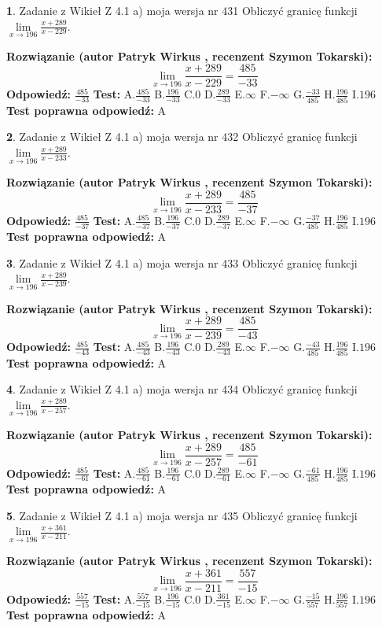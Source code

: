 \documentclass[12pt, a4paper]{article}
\theoremstyle{definition} %
\newtheorem{zad}{}
\newcommand{\zadStart}[1]{\begin{zad}#1\newline}
\newcommand{\zadStop}{\end{zad}}
\newcommand{\rozwStart}[2]{\noindent \textbf{Rozwiązanie (autor #1 , recenzent #2): }\newline}
\newcommand{\rozwStop}{\newline}
\newcommand{\odpStart}{\noindent \textbf{Odpowiedź:}\newline}
\newcommand{\odpStop}{\newline}
\newcommand{\testStart}{\noindent \textbf{Test:}\newline}
\newcommand{\testStop}{\newline}
\newcommand{\kluczStart}{\noindent \textbf{Test poprawna odpowiedź:}\newline}
\newcommand{\kluczStop}{\newline}
\begin{document}
\zadStart{Zadanie z Wikieł Z 4.1 a) moja wersja nr 431}
Obliczyć granicę funkcji $\lim\limits_{x\to196}\frac{x+289}{x-229}$.
\zadStop
\rozwStart{Patryk Wirkus}{Szymon Tokarski}
$$\lim\limits_{x\to196}\frac{x+289}{x-229} = \frac{485}{-33}$$
\rozwStop
\odpStart
$\frac{485}{-33}$
\odpStop
\testStart
A.$\frac{485}{-33}$
B.$\frac{196}{-33}$
C.$0$
D.$\frac{289}{-33}$
E.$\infty$
F.$-\infty$
G.$\frac{-33}{485}$
H.$\frac{196}{485}$
I.$196$
\testStop
\kluczStart
A
\kluczStop



\zadStart{Zadanie z Wikieł Z 4.1 a) moja wersja nr 432}
Obliczyć granicę funkcji $\lim\limits_{x\to196}\frac{x+289}{x-233}$.
\zadStop
\rozwStart{Patryk Wirkus}{Szymon Tokarski}
$$\lim\limits_{x\to196}\frac{x+289}{x-233} = \frac{485}{-37}$$
\rozwStop
\odpStart
$\frac{485}{-37}$
\odpStop
\testStart
A.$\frac{485}{-37}$
B.$\frac{196}{-37}$
C.$0$
D.$\frac{289}{-37}$
E.$\infty$
F.$-\infty$
G.$\frac{-37}{485}$
H.$\frac{196}{485}$
I.$196$
\testStop
\kluczStart
A
\kluczStop



\zadStart{Zadanie z Wikieł Z 4.1 a) moja wersja nr 433}
Obliczyć granicę funkcji $\lim\limits_{x\to196}\frac{x+289}{x-239}$.
\zadStop
\rozwStart{Patryk Wirkus}{Szymon Tokarski}
$$\lim\limits_{x\to196}\frac{x+289}{x-239} = \frac{485}{-43}$$
\rozwStop
\odpStart
$\frac{485}{-43}$
\odpStop
\testStart
A.$\frac{485}{-43}$
B.$\frac{196}{-43}$
C.$0$
D.$\frac{289}{-43}$
E.$\infty$
F.$-\infty$
G.$\frac{-43}{485}$
H.$\frac{196}{485}$
I.$196$
\testStop
\kluczStart
A
\kluczStop



\zadStart{Zadanie z Wikieł Z 4.1 a) moja wersja nr 434}
Obliczyć granicę funkcji $\lim\limits_{x\to196}\frac{x+289}{x-257}$.
\zadStop
\rozwStart{Patryk Wirkus}{Szymon Tokarski}
$$\lim\limits_{x\to196}\frac{x+289}{x-257} = \frac{485}{-61}$$
\rozwStop
\odpStart
$\frac{485}{-61}$
\odpStop
\testStart
A.$\frac{485}{-61}$
B.$\frac{196}{-61}$
C.$0$
D.$\frac{289}{-61}$
E.$\infty$
F.$-\infty$
G.$\frac{-61}{485}$
H.$\frac{196}{485}$
I.$196$
\testStop
\kluczStart
A
\kluczStop



\zadStart{Zadanie z Wikieł Z 4.1 a) moja wersja nr 435}
Obliczyć granicę funkcji $\lim\limits_{x\to196}\frac{x+361}{x-211}$.
\zadStop
\rozwStart{Patryk Wirkus}{Szymon Tokarski}
$$\lim\limits_{x\to196}\frac{x+361}{x-211} = \frac{557}{-15}$$
\rozwStop
\odpStart
$\frac{557}{-15}$
\odpStop
\testStart
A.$\frac{557}{-15}$
B.$\frac{196}{-15}$
C.$0$
D.$\frac{361}{-15}$
E.$\infty$
F.$-\infty$
G.$\frac{-15}{557}$
H.$\frac{196}{557}$
I.$196$
\testStop
\kluczStart
A
\kluczStop
\end{document}
